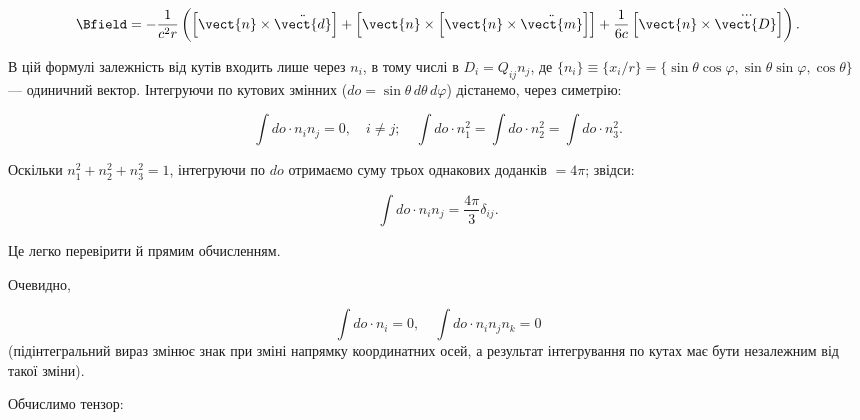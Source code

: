 \begin{equation}\label{eq:4.2.12}
\Bfield = -\frac{1}{c^2 r} \left(\left[ \vect{n} \times \ddot{\vect{d}} \right] + \left[ \vect{n} \times \left[ \vect{n} \times \ddot{\vect{m}} \right]
\right] + \frac{1}{6c} \left[ \vect{n} \times \dddot{\vect{D}} \right]\right).
\end{equation}

В цій формулі залежність від кутів входить лише через \( n_i \), в тому числі в \( D_i = Q_{ij} n_j \), де \( \{n_i\}
\equiv \{{x_i}/{r}\} = \{\sin \theta \cos \varphi, \sin \theta \sin \varphi, \cos \theta\} \) --- одиничний вектор.
Інтегруючи по кутових змінних (\( do = \sin \theta \, d\theta \, d\varphi \)) дістанемо, через симетрію:

\begin{equation*}
\int do \cdot n_i n_j = 0, \quad i \neq j; \quad \int do \cdot n_1^2 = \int do \cdot n_2^2 = \int do \cdot n_3^2.
\end{equation*}

Оскільки \( n_1^2 + n_2^2 + n_3^2 = 1 \), інтегруючи по \( do \) отримаємо суму трьох однакових доданків \( = 4\pi \);
звідси:

\begin{equation}\label{eq:4.2.13}
\int do \cdot n_i n_j = \frac{4\pi}{3} \delta_{ij}.
\end{equation}

Це легко перевірити й прямим обчисленням.

Очевидно,

\begin{equation}\label{eq:4.2.14}
\int do \cdot n_i = 0, \quad \int do \cdot n_i n_j n_k = 0
\end{equation}
%
(підінтегральний вираз змінює знак при зміні напрямку координатних осей, а результат інтегрування по кутах має бути
незалежним від такої зміни).

Обчислимо тензор:

